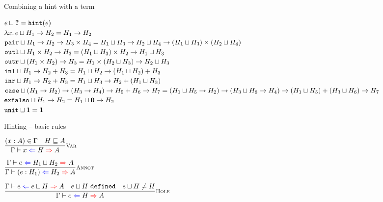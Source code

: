 \documentclass{beamer}
\begin{document}
\begin{frame}{Combining a hint with a term}

\begin{center}
  $e \sqcup \textbf{?} = \texttt{hint}(e)$ \\
  $\lambda x.\, e \sqcup H_1 \to H_2 = H_1 \to H_2$ \\
  $\texttt{pair} \sqcup H_1 \to H_2 \to H_3 \times H_4 = H_1 \sqcup H_3 \to H_2 \sqcup H_4 \to (H_1 \sqcup H_3) \times (H_2 \sqcup H_4)$ \\
  $\texttt{outl} \sqcup H_1 \times H_2 \to H_3 = (H_1 \sqcup H_3) \times H_2 \to H_1 \sqcup H_3$ \\
  $\texttt{outr} \sqcup (H_1 \times H_2) \to H_3 = H_1 \times (H_2 \sqcup H_3) \to H_2 \sqcup H_3$ \\
  $\texttt{inl} \sqcup H_1 \to H_2 + H_3 = H_1 \sqcup H_2 \to (H_1 \sqcup H_2) + H_3$ \\
  $\texttt{inr} \sqcup H_1 \to H_2 + H_3 = H_1 \sqcup H_3 \to H_2 + (H_1 \sqcup H_3)$ \\
  $\texttt{case} \sqcup (H_1 \to H_2) \to (H_3 \to H_4) \to H_5 + H_6 \to H_7 = (H_1 \sqcup H_5 \to H_2) \to (H_3 \sqcup H_6 \to H_4) \to (H_1 \sqcup H_5) + (H_3 \sqcup H_6) \to H_7$ \\
  $\texttt{exfalso} \sqcup H_1 \to H_2 = H_1 \sqcup \textbf{0} \to H_2$ \\
  $\texttt{unit} \sqcup \textbf{1} = \textbf{1}$
\end{center}

\end{frame}

\begin{frame}{Hinting -- basic rules}

\begin{center}
  $\infrule[Var]{\sidecond{(x : A) \in \Gamma} \quad \sidecond{\hintorder{H}{A}}}{\hinting{x}{H}{A}}$

  \vspace{2em}

  $\infrule[Annot]{\hinting{e}{\combinehints{H_1}{H_2}}{A}}{\hinting{\annot{e}{H_1}}{H_2}{A}}$

  \vspace{2em}

  $\infrule[Hole]{\hinting{e}{\combinehints{e}{H}}{A} \quad \sidecond{\combinehints{e}{H}\ \texttt{defined}} \quad \sidecond{\combinehints{e}{H} \neq H}}{\hinting{e}{H}{A}}$
\end{center}

\vspace{2em}

\end{frame}
\end{document}
